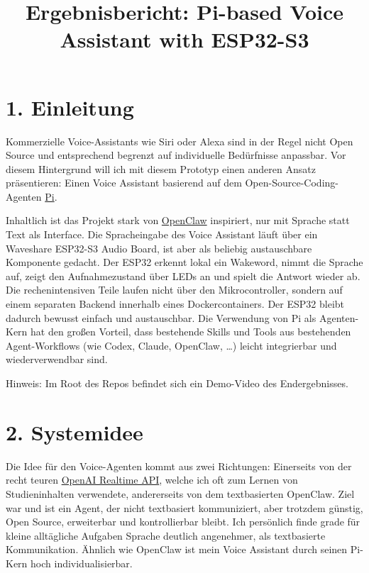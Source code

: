 \documentclass[11pt,a4paper]{article}
\title{Ergebnisbericht: Pi-based Voice Assistant with ESP32-S3}
\date{}
\begin{document}
\maketitle

\section*{1. Einleitung}

Kommerzielle Voice-Assistants wie Siri oder Alexa sind in der Regel nicht Open Source und entsprechend begrenzt auf individuelle Bedürfnisse anpassbar. Vor diesem Hintergrund will ich mit diesem Prototyp einen anderen Ansatz präsentieren: Einen Voice Assistant basierend auf dem Open-Source-Coding-Agenten \href{https://github.com/earendil-works/pi}{Pi}.

Inhaltlich ist das Projekt stark von \href{https://github.com/openclaw/openclaw}{OpenClaw} inspiriert, nur mit Sprache statt Text als Interface. Die Spracheingabe des Voice Assistant läuft über ein Waveshare ESP32-S3 Audio Board, ist aber als beliebig austauschbare Komponente gedacht. Der ESP32 erkennt lokal ein Wakeword, nimmt die Sprache auf, zeigt den Aufnahmezustand über LEDs an und spielt die Antwort wieder ab. Die rechenintensiven Teile laufen nicht über den Mikrocontroller, sondern auf einem separaten Backend innerhalb eines Dockercontainers. Der ESP32 bleibt dadurch bewusst einfach und austauschbar. Die Verwendung von Pi als Agenten-Kern hat den großen Vorteil, dass bestehende Skills und Tools aus bestehenden Agent-Workflows (wie Codex, Claude, OpenClaw, …) leicht integrierbar und wiederverwendbar sind.

Hinweis: Im Root des Repos befindet sich ein Demo-Video des Endergebnisses.

\section*{2. Systemidee}

Die Idee für den Voice-Agenten kommt aus zwei Richtungen: Einerseits von der recht teuren \href{https://developers.openai.com/api/docs/guides/realtime}{OpenAI Realtime API}, welche ich oft zum Lernen von Studieninhalten verwendete, andererseits von dem textbasierten OpenClaw. Ziel war und ist ein Agent, der nicht textbasiert kommuniziert, aber trotzdem günstig, Open Source, erweiterbar und kontrollierbar bleibt. Ich persönlich finde grade für kleine alltägliche Aufgaben Sprache deutlich angenehmer, als textbasierte Kommunikation. Ähnlich wie OpenClaw ist mein Voice Assistant durch seinen Pi-Kern hoch individualisierbar.
\end{document}
